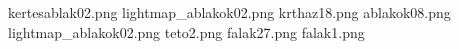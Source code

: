 kertesablak02.png
lightmap_ablakok02.png
krthaz18.png
ablakok08.png
lightmap_ablakok02.png
teto2.png
falak27.png
falak1.png
